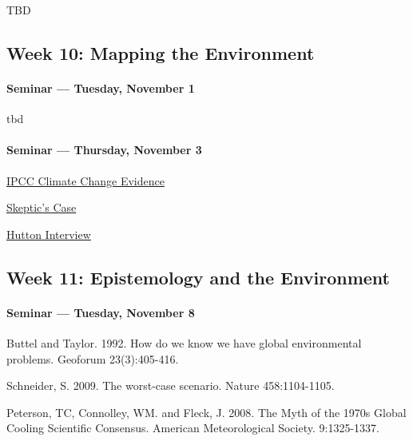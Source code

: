       \begin{itemize*}
      \item TBD
      \end{itemize*}
      
      \subsection{\textbf{Week 10:} Mapping the Environment}
      
      \paragraph{Seminar --- Tuesday, November 1}
      
      \begin{itemize*}
      \item tbd
      \end{itemize*}
    
      
      \paragraph{Seminar --- Thursday, November 3}
      
      \begin{itemize*}
      \item \href{https://www.youtube.com/watch?v=6yiTZm0y1YA&feature=youtu.be}{IPCC Climate Change Evidence}
      \item \href{https://www.youtube.com/watch?v=0gDErDwXqhc}{Skeptic's Case}
    \item \href{https://www.youtube.com/watch?v=BSKVqQK-7pE&feature=youtu.be}{Hutton Interview}
    \end{itemize*}
    
    
    \subsection{\textbf{Week 11}: Epistemology and the Environment}
    
    \paragraph{Seminar --- Tuesday, November 8}
    
    \begin{itemize*}
    \item Buttel and Taylor. 1992. How do we know we have global environmental problems. Geoforum 23(3):405-416.
    \item Schneider, S. 2009. The worst-case scenario. Nature 458:1104-1105.
    \item Peterson, TC, Connolley, WM. and Fleck, J. 2008. The Myth of the 1970s Global Cooling Scientific Consensus. American Meteorological Society. 9:1325-1337.
    \end{itemize*}

